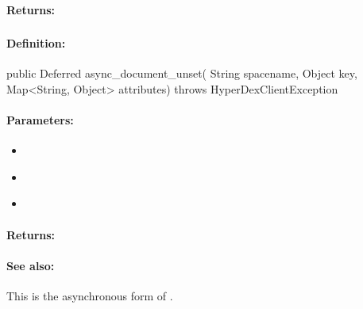 \paragraph{Returns:}


\pagebreak
\subsubsection{}
\label{api:java:async_document_unset}


\paragraph{Definition:}
\begin{javacode}
public Deferred async_document_unset(
        String spacename,
        Object key,
        Map<String, Object> attributes) throws HyperDexClientException
\end{javacode}

\paragraph{Parameters:}
\begin{itemize}[noitemsep]
\item {}\\

\item {}\\

\item {}\\

\end{itemize}

\paragraph{Returns:}


\paragraph{See also:}  This is the asynchronous form of .

